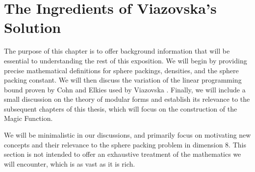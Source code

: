 \chapter{The Ingredients of Viazovska's Solution}
\thispagestyle{empty}

The purpose of this chapter is to offer background information that will be essential to understanding the rest of this exposition. We will begin by providing precise mathematical definitions for sphere packings, densities, and the sphere packing constant. We will then discuss the variation of the linear programming bound proven by Cohn and Elkies \cite[Theorem 3.1]{CohnElkies} used by Viazovska \cite[Theorem 2]{Viazovska8}. Finally, we will include a small discussion on the theory of modular forms and establish its relevance to the subsequent chapters of this thesis, which will focus on the construction of the Magic Function.

We will be minimalistic in our discussions, and primarily focus on motivating new concepts and their relevance to the sphere packing problem in dimension $8$. This section is not intended to offer an exhaustive treatment of the mathematics we will encounter, which is as vast as it is rich.



